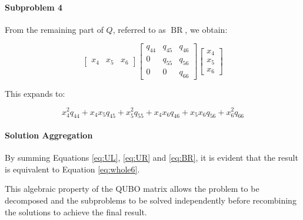 \paragraph{Subproblem 4} From the remaining part of $Q$, referred to as $\operatorname{BR}$, we obtain:

\begin{equation*}
    \begin{bmatrix}
        x_4 & x_5 & x_6
    \end{bmatrix}
    \begin{bmatrix}
        q_{44} & q_{45} & q_{46} \\
        0 & q_{55} & q_{56} \\
        0 & 0 & q_{66}
    \end{bmatrix}
    \begin{bmatrix}
        x_4 \\
        x_5 \\
        x_6
    \end{bmatrix}
\end{equation*}

This expands to:

\begin{equation}
 x_4^2q_{44} + x_4x_5q_{45} + x_5^2q_{55} + x_4x_6q_{46} + x_5x_6q_{56} + x_6^2q_{66}
    \label{eq:BR}
\end{equation}

\paragraph{Solution Aggregation} By summing Equations \ref{eq:UL}, \ref{eq:UR} and \ref{eq:BR}, it is evident that the result is equivalent to Equation \ref{eq:whole6}.

This algebraic property of the QUBO matrix allows the problem to be decomposed and the subproblems to be solved independently before recombining the solutions to achieve the final result.